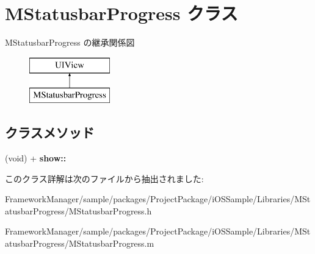 \hypertarget{interface_m_statusbar_progress}{}\section{M\+Statusbar\+Progress クラス}
\label{interface_m_statusbar_progress}
M\+Statusbar\+Progress の継承関係図\begin{figure}[H]
\begin{center}
\leavevmode
\includegraphics[height=2.000000cm]{interface_m_statusbar_progress}
\end{center}
\end{figure}
\subsection*{クラスメソッド}
\begin{DoxyCompactItemize}
\item 
\hypertarget{interface_m_statusbar_progress_a0b9ee44fba8726b0d54a9c5ddd8751b1}{}(void) + {\bfseries show\+::}\label{interface_m_statusbar_progress_a0b9ee44fba8726b0d54a9c5ddd8751b1}

\end{DoxyCompactItemize}


このクラス詳解は次のファイルから抽出されました\+:\begin{DoxyCompactItemize}
\item 
Framework\+Manager/sample/packages/\+Project\+Package/i\+O\+S\+Sample/\+Libraries/\+M\+Statusbar\+Progress/M\+Statusbar\+Progress.\+h\item 
Framework\+Manager/sample/packages/\+Project\+Package/i\+O\+S\+Sample/\+Libraries/\+M\+Statusbar\+Progress/M\+Statusbar\+Progress.\+m\end{DoxyCompactItemize}
